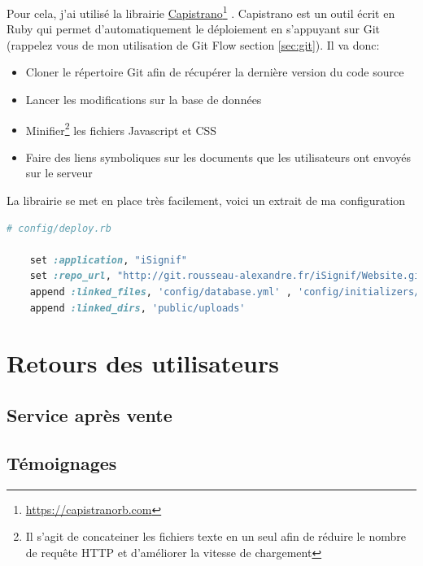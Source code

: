\documentclass[]{report}
\newcommand\fnurl[2]{%
  \href{#1}{#2}\footnote{\url{#1}}%
}
\begin{document}
    Pour cela, j'ai utilisé la librairie \fnurl{https://capistranorb.com}{Capistrano}. Capistrano est un outil écrit en Ruby qui permet d'automatiquement le déploiement en s'appuyant sur Git (rappelez vous de mon utilisation de Git Flow section \ref{sec:git}). Il va donc:

    \begin{itemize}
      \item Cloner le répertoire Git afin de récupérer la dernière version du code source
      \item Lancer les modifications sur la base de données
      \item Minifier\footnote{Il s'agit de concateiner les fichiers texte en un seul afin de réduire le nombre de requête HTTP et d'améliorer la vitesse de chargement} les fichiers Javascript et CSS
      \item Faire des liens symboliques sur les documents que les utilisateurs ont envoyés sur le serveur
    \end{itemize}

    La librairie se met en place très facilement, voici un extrait de ma configuration

    \begin{scriptsize}
    \begin{lstlisting}[language=ruby]
    # config/deploy.rb

    set :application, "iSignif"
    set :repo_url, "http://git.rousseau-alexandre.fr/iSignif/Website.git"
    append :linked_files, 'config/database.yml' , 'config/initializers/secret_token.rb', 'config/secrets.yml'
    append :linked_dirs, 'public/uploads'
    \end{lstlisting}
    \end{scriptsize}

  \section{Retours des utilisateurs}\label{sec:feedback}

    \subsection{Service après vente}


    \subsection{Témoignages}
\end{document}
